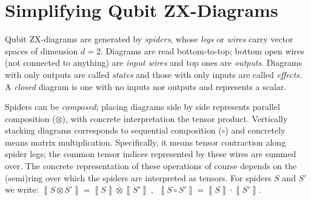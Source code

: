 \section{Simplifying Qubit ZX-Diagrams}



Qubit ZX-diagrams are generated by \emph{spiders}, whose \emph{legs}
or \emph{wires} carry vector spaces of dimension $d=2$.
Diagrams are read bottom-to-top; bottom open wires (not connected to anything) are \emph{input wires} and top ones are \emph{outputs}.
Diagrams with only outputs are called \emph{states} and those with only inputs are called \emph{effects}.
A \emph{closed} diagram is one with no inputs nor outputs and represents a scalar.

Spiders can be \emph{composed};
placing diagrams side by side represents parallel composition ($\otimes$),
with concrete interpretation the tensor product.
Vertically stacking diagrams corresponds to sequential composition ($\circ$) and concretely means matrix multiplication.
Specifically, it means tensor contraction along spider legs; the common tensor indices represented by these wires are summed over.
The concrete representation of these operations of course depends on the (semi)ring over which the spiders are interpreted as tensors.
For spiders $S$ and $S'$ we write:
$\left\llbracket S \otimes S' \right\rrbracket = \left\llbracket S \right\rrbracket \otimes \left\llbracket S' \right\rrbracket ~, ~~
	\left\llbracket S \circ S' \right\rrbracket = \left\llbracket S \right\rrbracket \cdot \left\llbracket S' \right\rrbracket $.


